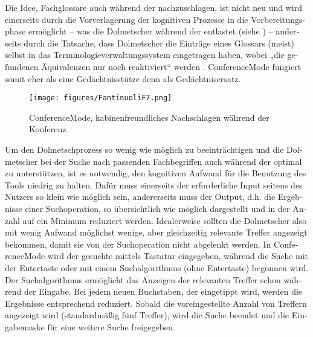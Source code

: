 \documentclass[output=paper]{LSP/langsci}
\begin{document}
\begin{otherlanguage}{ngerman}
Die Idee, Fachglossare auch während der  nachzuschlagen, ist nicht neu \citep{Stoll2002} und wird einerseits durch die Vorverlagerung der kognitiven Prozesse in die Vorbereitungsphase ermöglicht -- was die Dolmetscher während der  entlastet (siehe ) -- anderseits durch die Tatsache, dass Dolmetscher die Einträge eines Glossars (meist) selbst in das Terminologieverwaltungssystem eingetragen haben, wobei „die gefundenen Äquivalenzen nur noch reaktiviert“ werden \citep[18]{Drechsel2005}. ConferenceMode fungiert somit eher als eine Gedächtnisstütze denn als Gedächtnisersatz. 

\begin{figure}
\texttt{[image: figures/FantinuoliF7.png]}
\caption{ConferenceMode, kabinenfreundliches Nachschlagen während der Konferenz}
\label{fig:fantinuoli:7}
\end{figure} 

Um den Dolmetschprozess so wenig wie möglich zu beeinträchtigen und die Dolmetscher bei der Suche nach passenden Fachbegriffen auch während der  optimal zu unterstützen, ist es notwendig, den kognitiven Aufwand für die Benutzung des Tools niedrig zu halten. Dafür muss einerseits der erforderliche Input seitens des Nutzers so klein wie möglich sein, andererseits muss der Output, d.h. die Ergebnisse einer Suchoperation, so übersichtlich wie möglich dargestellt und in der Anzahl auf ein Minimum reduziert werden. Idealerweise sollten die Dolmetscher also mit wenig Aufwand möglichst wenige, aber gleichzeitig relevante Treffer angezeigt bekommen, damit sie von der Suchoperation nicht abgelenkt werden. In ConferenceMode wird der gesuchte  mittels Tastatur eingegeben, während die Suche mit der Entertaste oder mit einem Suchalgorithmus (ohne Entertaste) begonnen wird. Der Suchalgorithmus ermöglicht das Anzeigen der relevanten Treffer schon während der Eingabe. Bei jedem neuen Buchstaben, der eingetippt wird, werden die Ergebnisse entsprechend reduziert. Sobald die voreingestellte Anzahl von Treffern angezeigt wird (standardmäßig fünf Treffer), wird die Suche beendet und die Eingabemaske für eine weitere Suche freigegeben. 


\end{otherlanguage}
\end{document}
